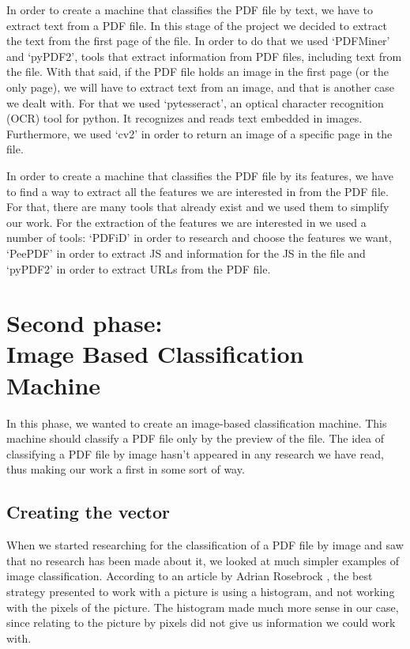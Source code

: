 \documentclass{article}
\begin{document}
\indent In order to create a machine that classifies the PDF file by text, we have to extract text from a PDF file. In this stage of the project we decided to extract the text from the first page of the file. In order to do that we used ‘PDFMiner’ and ‘pyPDF2’, tools that extract information from PDF files, including text from the file. With that said, if the PDF file holds an image in the first page (or the only page), we will have to extract text from an image, and that is another case we dealt with. For that we used ‘pytesseract’, an optical character recognition (OCR) tool for python. It recognizes and reads text embedded in images. Furthermore, we used ‘cv2’ in order to return an image of a specific page in the file.

\indent In order to create a machine that classifies the PDF file by its features, we have to find a way to extract all the features we are interested in from the PDF file. For that, there are many tools that already exist and we used them to simplify our work. For the extraction of the features we are interested in we used a number of tools: ‘PDFiD’ in order to research and choose the features we want, ‘PeePDF’ in order to extract JS and information for the JS in the file and ‘pyPDF2’ in order to extract URLs from the PDF file.

\section[Second phase: Image Based Classification Machine]{Second phase: \\ Image Based Classification Machine}
\indent In this phase, we wanted to create an image-based classification machine. This machine should classify a PDF file only by the preview of the file. The idea of classifying a PDF file by image hasn't appeared in any research we have read, thus making our work a first in some sort of way.

\subsection{Creating the vector}
\indent When we started researching for the classification of a PDF file by image and saw that no research has been made about it, we looked at much simpler examples of image classification. According to an article by Adrian Rosebrock \cite{HistogramImage}, the best strategy presented to work with a picture is using a histogram, and not working with the pixels of the picture. The histogram made much more sense in our case, since relating to the picture by pixels did not give us information we could work with.
\end{document}

